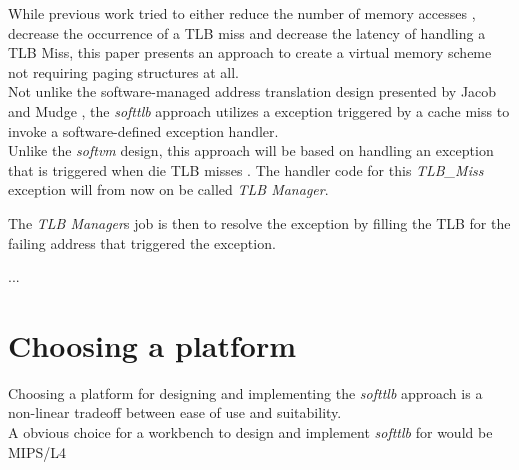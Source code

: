 




While previous work tried to either reduce the number of memory accesses ,
decrease the occurrence of a TLB miss and decrease the latency of handling a TLB Miss, this paper
presents an approach to create a virtual memory scheme not requiring paging structures at all.\\

Not unlike the software-managed address translation design presented by Jacob and Mudge \cite{jacobSoftwaremanagedAddressTranslation1997},
the \textit{softtlb} approach utilizes a exception triggered by a cache miss to invoke a software-defined
exception handler.\\
Unlike the \textit{softvm} design, this approach will be based on handling an exception that is triggered
when die TLB misses .
The handler code for this \textit{TLB\_Miss} exception will from now on be called \textit{TLB Manager}.

The \textit{TLB Manager}s job is then to resolve the exception by filling the TLB for the failing address
that triggered the exception.

...

\section{Choosing a platform}
Choosing a platform for designing and implementing the \textit{softtlb} approach is a non-linear tradeoff between
ease of use and suitability.\\
A obvious choice for a workbench to design and implement \textit{softtlb} for would be MIPS/L4 \cite{heiserAnatomyHighPerformanceMicrokernel}


